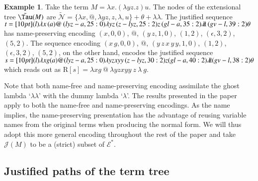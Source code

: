 \documentclass{elsarticle}
\theoremstyle{plain}
\theoremstyle{definition}
\newtheorem{example}{Example}[section]
\newcommand\Nodes{\mathcal{N}}%
\newcommand{\ghostlmd}{{\lambda\!\!\lambda}}
\newcommand{\ghostvar}{\theta}
\newcommand\ExtendedNodes{\tilde{\Nodes}}
\def\readout{\mathrm{R}} %
\def\nameencoding{\mathcal{E}} %
\newcommand{\exttree}{\tilde{\Tau}} %
\def\justseqset{\mathcal{J}}
\begin{document}
\begin{example}
\label{examp:ghost_materialization}
    Take the term $M = \lambda x. (\lambda y z.z) u$. The nodes of the extensional tree $\exttree(M)$ are $\ExtendedNodes = \{ \lambda x, @, \lambda y z, z, \lambda, u \} + \ghostvar + \ghostlmd$. The justified sequence
    $t = \Pstr[10pt]{
        (l){\lambda x} \, (a)@ \, (lyz-a,25:0){\lambda y z} \, (z-lyz,25:2)z \, (gl-a,35:2)\ghostlmd \, (gv-l,39:2)\ghostvar }
    $
    has name-preserving encoding
    $(x ,0,0)$,
    $@$,
    $(y\, z, 1,0)$,
    $(1,2)$,
    $(\epsilon,3,2)$,
    $(5,2)$.
    The sequence encoding
    $ (x\, g, 0, 0)$,
    $@$,
    $(y\, z\, x\, y\, y, 1,0)$,
    $(1,2)$,
    $(\epsilon,3,2)$,
    $(5,2)$, on the other hand, encodes the justified sequence
    $s= \Pstr[10pt]{
        (l){\lambda x g}
         (a)@
         (lyz-a,25:0){\lambda y z x y y}
         \,(z-lyz,30:2)z
         (gl-a,40:2)\ghostlmd
         (gv-l,38:2)\ghostvar }
    $ which reads out as $\readout[s]= \lambda x g ~ @ ~ \lambda y z x y y ~ z ~ \lambda ~ g$.
\end{example}


Note that both name-free and name-preserving encoding assimilate the ghost lambda `$\ghostlmd$' with the dummy lambda `$\lambda$'.
%
The results presented in the paper apply to both the name-free and name-preserving encodings. As the name implies, the name-preserving presentation has the advantage of reusing variable names from the original terms when producing the normal form. We will thus adopt this more general encoding throughout the rest of the paper and take $\justseqset(M)$ to be a (strict) subset of $\nameencoding^*$.


\subsection{Justified paths of the term tree}
\end{document}
